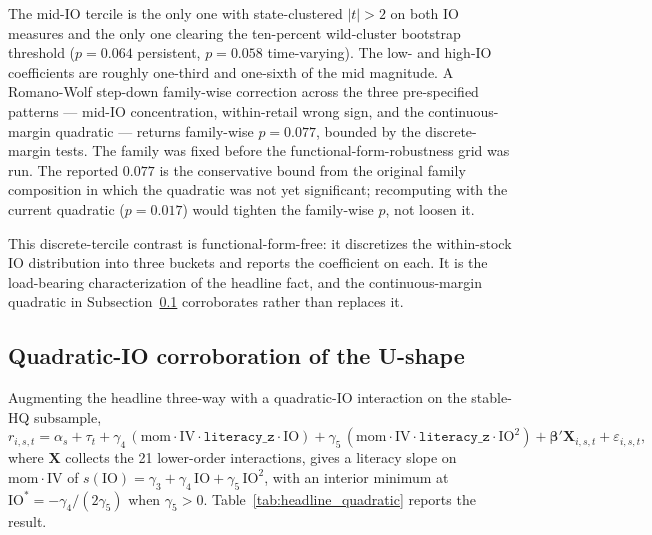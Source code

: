 The mid-IO tercile is the only one with state-clustered $|t|>2$ on both IO measures and the only one clearing the ten-percent wild-cluster bootstrap threshold ($p = 0.064$ persistent, $p = 0.058$ time-varying). The low- and high-IO coefficients are roughly one-third and one-sixth of the mid magnitude. A Romano-Wolf step-down family-wise correction across the three pre-specified patterns --- mid-IO concentration, within-retail wrong sign, and the continuous-margin quadratic --- returns family-wise $p = 0.077$, bounded by the discrete-margin tests. The family was fixed before the functional-form-robustness grid was run. The reported $0.077$ is the conservative bound from the original family composition in which the quadratic was not yet significant; recomputing with the current quadratic ($p = 0.017$) would tighten the family-wise $p$, not loosen it.

This discrete-tercile contrast is functional-form-free: it discretizes the within-stock IO distribution into three buckets and reports the coefficient on each. It is the load-bearing characterization of the headline fact, and the continuous-margin quadratic in Subsection~\ref{sec:quadratic} corroborates rather than replaces it.

\subsection{Quadratic-IO corroboration of the U-shape}
\label{sec:quadratic}

Augmenting the headline three-way with a quadratic-IO interaction on the stable-HQ subsample,
\begin{equation}
\label{eq:quadIO}
r_{i,s,t} = \alpha_{s} + \tau_{t}
+ \gamma_{4}\,(\mathrm{mom}\cdot\mathrm{IV}\cdot\mathtt{literacy\_z}\cdot\mathrm{IO})
+ \gamma_{5}\,(\mathrm{mom}\cdot\mathrm{IV}\cdot\mathtt{literacy\_z}\cdot\mathrm{IO}^{2})
+ \boldsymbol{\beta}'\mathbf{X}_{i,s,t} + \varepsilon_{i,s,t},
\end{equation}
where $\mathbf{X}$ collects the 21 lower-order interactions, gives a literacy slope on $\mathrm{mom}\cdot\mathrm{IV}$ of $s(\mathrm{IO}) = \gamma_{3} + \gamma_{4}\,\mathrm{IO} + \gamma_{5}\,\mathrm{IO}^{2}$, with an interior minimum at $\mathrm{IO}^{\ast} = -\gamma_{4}/(2\gamma_{5})$ when $\gamma_{5} > 0$. Table~\ref{tab:headline_quadratic} reports the result.

